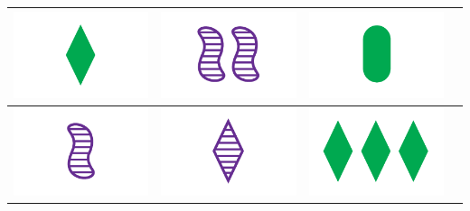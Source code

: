 \documentclass[a4paper,12pt,titlepage]{article}
\theoremstyle{plain}
\theoremstyle{definition}
\begin{document}
\begin{table}[h]
\begin{tabular}{ c | c | c | c }
\includegraphics[scale=0.2]{Img/0012.png} &
\includegraphics[scale=0.2]{Img/1121.png} &
\includegraphics[scale=0.2]{Img/0010.png} \\
\hline
\includegraphics[scale=0.2]{Img/0121.png} &
\includegraphics[scale=0.2]{Img/0122.png} &
\includegraphics[scale=0.2]{Img/2012.png} &

\end{tabular}
\end{table}
\end{document}
